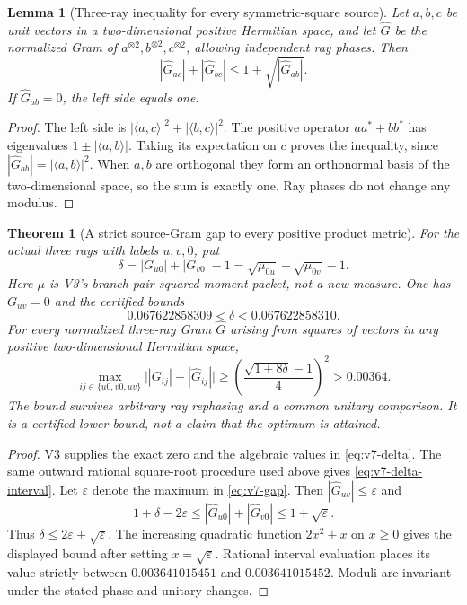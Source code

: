 \documentclass[11pt]{article}
\newtheorem{theorem}{Theorem}[section]
\newtheorem{lemma}[lemma]{Lemma}
\theoremstyle{definition}
\theoremstyle{remark}
\begin{document}
\begin{lemma}[Three-ray inequality for every symmetric-square source]
\label{lem:v7-product-inequality}
Let $a,b,c$ be unit vectors in a two-dimensional positive Hermitian space,
and let $\widehat G$ be the normalized Gram of $a^{\otimes2},b^{\otimes2},
c^{\otimes2}$, allowing independent ray phases. Then
\begin{equation}
 \boxed{|\widehat G_{ac}|+|\widehat G_{bc}|
      \le 1+\sqrt{|\widehat G_{ab}|}.}
 \label{eq:v7-product-inequality}
\end{equation}
If $\widehat G_{ab}=0$, the left side equals one.
\end{lemma}
\begin{proof}
The left side is $|\langle a,c\rangle|^2+|\langle b,c\rangle|^2$.
The positive operator $aa^*+bb^*$ has eigenvalues
$1\pm|\langle a,b\rangle|$. Taking its expectation on $c$ proves the
inequality, since $|\widehat G_{ab}|=|\langle a,b\rangle|^2$.
When $a,b$ are orthogonal they form an orthonormal basis of the two-dimensional
space, so the sum is exactly one. Ray phases do not change any modulus.
\end{proof}

\begin{theorem}[A strict source-Gram gap to every positive product metric]
\label{thm:v7-Gram-gap}
For the actual three rays with labels $u,v,0$, put
\begin{equation}
 \delta=|G_{u0}|+|G_{v0}|-1
       =\sqrt{\mu_{0u}}+\sqrt{\mu_{0v}}-1.
 \label{eq:v7-delta}
\end{equation}
Here $\mu$ is V3's branch-pair squared-moment packet, not a new measure.
One has $G_{uv}=0$ and the certified bounds
\begin{equation}
 0.067622858309<\delta<0.067622858310.
 \label{eq:v7-delta-interval}
\end{equation}
For every normalized three-ray Gram $\widehat G$ arising from squares of
vectors in any positive two-dimensional Hermitian space,
\begin{equation}
 \boxed{
 \max_{ij\in\{u0,v0,uv\}}
  \bigl||G_{ij}|-|\widehat G_{ij}|\bigr|
 \ge \left(\frac{\sqrt{1+8\delta}-1}{4}\right)^2
 >0.00364.}
 \label{eq:v7-gap}
\end{equation}
The bound survives arbitrary ray rephasing and a common unitary comparison.
It is a certified lower bound, not a claim that the optimum is attained.
\end{theorem}
\begin{proof}
V3 supplies the exact zero and the algebraic values in
\eqref{eq:v7-delta}. The same outward rational square-root procedure used
above gives \eqref{eq:v7-delta-interval}. Let $\varepsilon$ denote the
maximum in \eqref{eq:v7-gap}. Then
$|\widehat G_{uv}|\le\varepsilon$ and
\[
 1+\delta-2\varepsilon
 \le |\widehat G_{u0}|+|\widehat G_{v0}|
 \le 1+\sqrt\varepsilon.
\]
Thus $\delta\le2\varepsilon+\sqrt\varepsilon$.
The increasing quadratic function $2x^2+x$ on $x\ge0$ gives the displayed
bound after setting $x=\sqrt\varepsilon$. Rational interval evaluation
places its value strictly between $0.003641015451$ and $0.003641015452$.
Moduli are invariant under the stated phase and unitary changes.
\end{proof}
\end{document}
